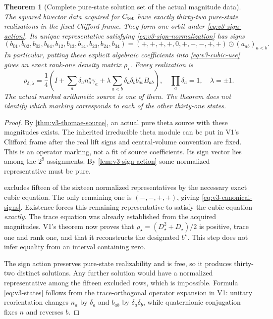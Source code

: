 \documentclass[11pt]{article}
\newtheorem{theorem}{Theorem}[section]
\theoremstyle{definition}
\theoremstyle{remark}
\begin{document}
\begin{theorem}[Complete pure-state solution set of the actual magnitude data]
\label{thm:v3-thirtytwo}
The squared bivector data acquired for $C_{\rm tet}$ have exactly
thirty-two pure-state realizations in the fixed Clifford frame. They form
one orbit under \eqref{eq:v3-sign-action}. Its unique representative
satisfying \eqref{eq:v3-sign-normalization} has signs
\begin{equation}
 \boxed{(b_{01},b_{02},b_{03},b_{04},b_{12},b_{13},b_{14},b_{23},b_{24},b_{34})
       =(+,+,+,+,0,+,-,-,+,+)\odot(a_{ab})_{a<b}.}
 \label{eq:v3-canonical-signs}
\end{equation}
In particular, putting these explicit algebraic coefficients into
\eqref{eq:v3-cubic-use} gives an exact rank-one density matrix
$\rho_\star$. Every realization is
\begin{equation}
 \boxed{\rho_{\delta,\lambda}
    =\frac14\left(I+\sum_a\delta_a n_a^\star\gamma_a
           +\lambda\sum_{a<b}\delta_a\delta_b b_{ab}^\star B_{ab}\right),
       \quad \prod_a\delta_a=1,\quad\lambda=\pm1.}
 \label{eq:v3-states}
\end{equation}
The actual marked arithmetic source is one of them. The theorem does not
identify which marking corresponds to each of the other thirty-one states.
\end{theorem}
\begin{proof}
By \cref{thm:v3-thomae-source}, an actual pure theta source with these
magnitudes exists. The inherited irreducible theta module can be put in
V1's Clifford frame after the real lift signs and central-volume convention
are fixed. This is an operator marking, not a fit of source coefficients.
Its sign vector lies among the $2^9$ assignments. By
\cref{lem:v3-sign-action} some normalized representative must be pure.

 excludes fifteen of the sixteen normalized
representatives by the necessary exact cubic equation. The only remaining
one is $(-,-,+,+)$, giving \eqref{eq:v3-canonical-signs}. Existence forces
this remaining representative to satisfy the cubic equation \emph{exactly}.
The trace equation was already established from the acquired magnitudes.
V1's theorem now proves that $\rho_\star=(D_\star^2+D_\star)/2$ is
positive, trace one and rank one, and that it reconstructs the designated
$b^\star$. This step does not infer equality from an interval containing
zero.

The sign action preserves pure-state realizability and is free, so it
produces thirty-two distinct solutions. Any further solution would have a
normalized representative among the fifteen excluded rows, which is
impossible. Formula \eqref{eq:v3-states} follows from the trace-orthogonal
operator expansion in V1: unitary reorientation changes $n_a$ by $\delta_a$
and $b_{ab}$ by $\delta_a\delta_b$, while quaternionic conjugation fixes
$n$ and reverses $b$.
\end{proof}
\end{document}
